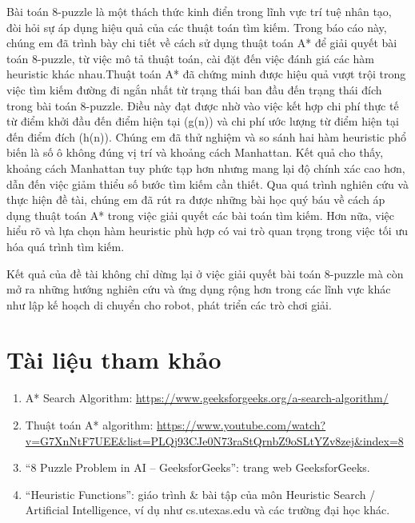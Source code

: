 \documentclass{article}
\begin{document}
Bài toán 8-puzzle là một thách thức kinh điển trong lĩnh vực trí tuệ nhân tạo, đòi hỏi sự áp dụng hiệu quả của các thuật toán tìm kiếm. Trong báo cáo này, chúng em đã trình bày chi tiết về cách sử dụng thuật toán A* để giải quyết bài toán 8-puzzle, từ việc mô tả thuật toán, cài đặt đến việc đánh giá các hàm heuristic khác nhau.Thuật toán A* đã chứng minh được hiệu quả vượt trội trong việc tìm kiếm đường đi ngắn nhất từ trạng thái ban đầu đến trạng thái đích trong bài toán 8-puzzle. Điều này đạt được nhờ vào việc kết hợp chi phí thực tế từ điểm khởi đầu đến điểm hiện tại (g(n)) và chi phí ước lượng từ điểm hiện tại đến điểm đích (h(n)). Chúng em đã thử nghiệm và so sánh hai hàm heuristic phổ biến là số ô không đúng vị trí và khoảng cách Manhattan. Kết quả cho thấy, khoảng cách Manhattan tuy phức tạp hơn nhưng mang lại độ chính xác cao hơn, dẫn đến việc giảm thiểu số bước tìm kiếm cần thiết. 
Qua quá trình nghiên cứu và thực hiện đề tài, chúng em đã rút ra được những bài học quý báu về cách áp dụng thuật toán A* trong việc giải quyết các bài toán tìm kiếm. Hơn nữa, việc hiểu rõ và lựa chọn hàm heuristic phù hợp có vai trò quan trọng trong việc tối ưu hóa quá trình tìm kiếm.

 Kết quả của đề tài không chỉ dừng lại ở việc giải quyết bài toán 8-puzzle mà còn mở ra những hướng nghiên cứu và ứng dụng rộng hơn trong các lĩnh vực khác như lập kế hoạch di chuyển cho robot, phát triển các trò chơi giải.

\newpage
 \section*{Tài liệu tham khảo}

\begin{enumerate}

    \item A* Search Algorithm: \url{https://www.geeksforgeeks.org/a-search-algorithm/}
    \item Thuật toán A* algorithm: 
    \url{https://www.youtube.com/watch?v=G7XnNtF7UEE&list=PLQj93CJe0N73raStQrnbZ9oSLtYZv8zej&index=8}
    \item “8 Puzzle Problem in AI – GeeksforGeeks”: trang web GeeksforGeeks.
    \item  “Heuristic Functions”: giáo trình \& bài tập của môn Heuristic Search / Artificial Intelligence, 
    ví dụ như cs.utexas.edu và các trường đại học khác.
    
\end{enumerate}

 
\end{document}
